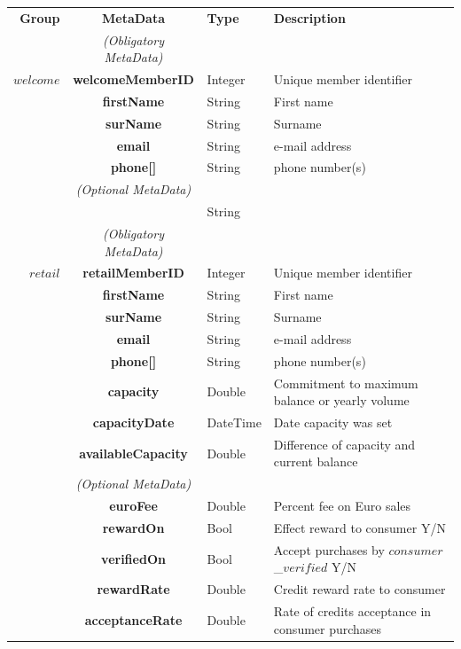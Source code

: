 \setlength{\tabcolsep}{7pt}
\setlength\extrarowheight{3pt}
\begin{table}[H]
\begin{centering}
\small
{
\begin{tabular}{ r | c | l | l }
\textbf{Group}	& {\bf MetaData} & {\bf Type} & {\bf Description} \\
\Xhline{1.5pt}
			& \emph{(Obligatory MetaData)} & & \\
\cline{2-2}
$welcome$	& {\bf welcomeMemberID}	&Integer & Unique member identifier \\
			& {\bf firstName}			&String & First name \\
			& {\bf surName}			&String & Surname \\
			& {\bf email}				&String & e-mail address \\
			& {\bf phone[]}				&String	& phone number(s) \\
\cline{2-2}
			 & \emph{(Optional MetaData)}& & \\
\cline{2-2}
			& {\bf }					&String &  \\
\Xhline{1.5pt}
			& \emph{(Obligatory MetaData)} & & \\
\cline{2-2}
$retail$		& {\bf retailMemberID}		&Integer & Unique member identifier \\
			& {\bf firstName	}		&String & First name \\
			& {\bf surName}			&String & Surname \\
			& {\bf email}				&String & e-mail address \\
			& {\bf phone[]}				&String	& phone number(s) \\
			& {\bf capacity}				&Double & Commitment to maximum balance or yearly volume \\
			& {\bf capacityDate}			&DateTime & Date capacity was set \\
			& {\bf availableCapacity}		&Double & Difference of capacity and current balance \\
\cline{2-2}
			 & \emph{(Optional MetaData)}& & \\
\cline{2-2}
			& {\bf euroFee}				&Double & Percent fee on Euro sales \\
			& {\bf rewardOn}			&Bool & Effect reward to consumer Y/N \\
			& {\bf verifiedOn}			&Bool & Accept purchases by $consumer$\_$verified$ Y/N \\
			& {\bf rewardRate}			&Double & Credit reward rate to consumer \\
			& {\bf acceptanceRate}		&Double & Rate of credits acceptance in consumer purchases\\

\end{tabular}}
\end{centering}
\end{table}
